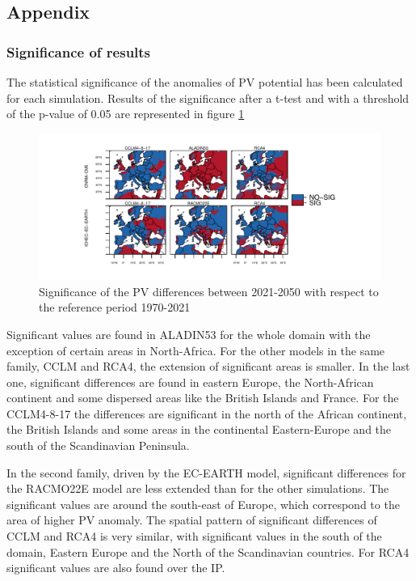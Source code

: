 \begin{subappendices}

  \section{Appendix}

  \subsubsection{Significance of results}

The statistical significance of the anomalies of PV potential has been calculated for each simulation. Results of the significance after a t-test and with a threshold of the p-value of 0.05 are represented in figure \ref{fig:pvalor}

\begin{figure}[h]
    \includegraphics[width=1\textwidth]{figs/capitulo7/pvalor_prueba.pdf}
    \caption[Statistical significance of PV anomalies]{Significance of the PV differences between 2021-2050 with respect to the reference period 1970-2021}
\label{fig:pvalor}
\end{figure}

Significant values are found in ALADIN53 for the whole domain with the exception of certain areas in North-Africa. For the other models in the same family, CCLM and RCA4, the extension of significant areas is smaller. In the last one, significant differences are found in eastern Europe, the North-African continent and some dispersed areas like the British Islands and France. For the CCLM4-8-17 the differences are significant in the north of the African continent, the British Islands and some areas in the continental Eastern-Europe and the south of the Scandinavian Peninsula.

In the second family, driven by the EC-EARTH model, significant differences for the RACMO22E model are less extended than for the other simulations. The significant values are around the south-east of Europe, which correspond to the area of higher PV anomaly. The spatial pattern of significant differences of CCLM and RCA4 is very similar, with significant values in the south of the domain, Eastern Europe and the North of the Scandinavian countries. For RCA4 significant values are also found over the IP. 


\end{subappendices}
